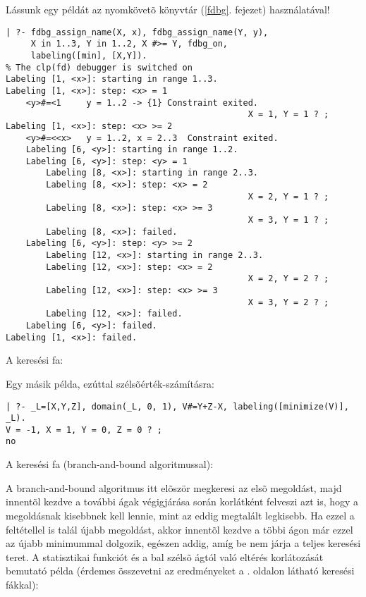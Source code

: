 Lássunk egy példát az \fdbg nyomkövetõ könyvtár (\ref{fdbg}. fejezet) használatával!
\br
\begin{verbatim}
| ?- fdbg_assign_name(X, x), fdbg_assign_name(Y, y), 
     X in 1..3, Y in 1..2, X #>= Y, fdbg_on, 
     labeling([min], [X,Y]).
% The clp(fd) debugger is switched on
Labeling [1, <x>]: starting in range 1..3.
Labeling [1, <x>]: step: <x> = 1
    <y>#=<1     y = 1..2 -> {1} Constraint exited.
                                                X = 1, Y = 1 ? ;
Labeling [1, <x>]: step: <x> >= 2
    <y>#=<<x>   y = 1..2, x = 2..3  Constraint exited.
    Labeling [6, <y>]: starting in range 1..2.
    Labeling [6, <y>]: step: <y> = 1
        Labeling [8, <x>]: starting in range 2..3.
        Labeling [8, <x>]: step: <x> = 2
                                                X = 2, Y = 1 ? ;
        Labeling [8, <x>]: step: <x> >= 3
                                                X = 3, Y = 1 ? ;
        Labeling [8, <x>]: failed.
    Labeling [6, <y>]: step: <y> >= 2
        Labeling [12, <x>]: starting in range 2..3.
        Labeling [12, <x>]: step: <x> = 2
                                                X = 2, Y = 2 ? ;
        Labeling [12, <x>]: step: <x> >= 3
                                                X = 3, Y = 2 ? ;
        Labeling [12, <x>]: failed.
    Labeling [6, <y>]: failed.
Labeling [1, <x>]: failed.
\end{verbatim}

A keresési fa:

\begin{center}
\end{center}

Egy másik példa, ezúttal szélsõérték-számításra:

\begin{verbatim}
| ?- _L=[X,Y,Z], domain(_L, 0, 1), V#=Y+Z-X, labeling([minimize(V)], _L).
V = -1, X = 1, Y = 0, Z = 0 ? ;
no
\end{verbatim}

A keresési fa (branch-and-bound algoritmussal):

\begin{center}
\end{center}

A branch-and-bound algoritmus itt elõször megkeresi az elsõ megoldást, majd innentõl
kezdve a további ágak végigjárása során korlátként felveszi azt is, hogy a megoldásnak
kisebbnek kell lennie, mint az eddig megtalált legkisebb. Ha ezzel a feltétellel is
talál újabb megoldást, akkor innentõl kezdve a többi ágon már ezzel az újabb minimummal
dolgozik, egészen addig, amíg be nem járja a teljes keresési teret.
\br
A statisztikai funkciót  és a bal szélsõ ágtól való eltérés korlátozását bemutató példa
(érdemes összevetni az eredményeket a \pageref{kerfak}. oldalon látható keresési
fákkal):

